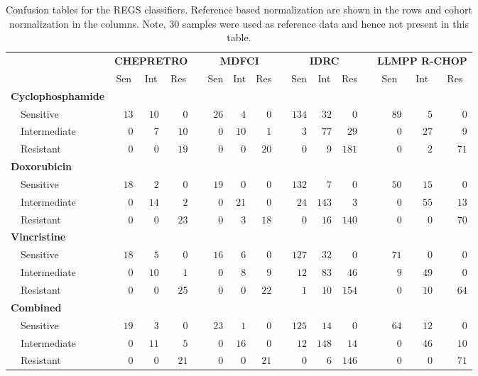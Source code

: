 \begin{table}[!tbp]
\begin{adjustwidth}{-1.5in}{0in}
{\small
\caption{Confusion tables for the REGS classifiers.
Reference based normalization are shown in the rows and cohort normalization in
the columns. Note, 30 samples were used as reference data and hence not present
in this table.\label{tab:confusiondrugreference}} 
\begin{center}
\begin{tabular}{lrrrcrrrcrrrcrrr}
\hline\hline
\multicolumn{1}{l}{\bfseries }&\multicolumn{3}{c}{\bfseries CHEPRETRO}&\multicolumn{1}{c}{\bfseries }&\multicolumn{3}{c}{\bfseries MDFCI}&\multicolumn{1}{c}{\bfseries }&\multicolumn{3}{c}{\bfseries IDRC}&\multicolumn{1}{c}{\bfseries }&\multicolumn{3}{c}{\bfseries LLMPP R-CHOP}\tabularnewline
\cline{2-4} \cline{6-8} \cline{10-12} \cline{14-16}
\multicolumn{1}{l}{}&\multicolumn{1}{c}{Sen}&\multicolumn{1}{c}{Int}&\multicolumn{1}{c}{Res}&\multicolumn{1}{c}{}&\multicolumn{1}{c}{Sen}&\multicolumn{1}{c}{Int}&\multicolumn{1}{c}{Res}&\multicolumn{1}{c}{}&\multicolumn{1}{c}{Sen}&\multicolumn{1}{c}{Int}&\multicolumn{1}{c}{Res}&\multicolumn{1}{c}{}&\multicolumn{1}{c}{Sen}&\multicolumn{1}{c}{Int}&\multicolumn{1}{c}{Res}\tabularnewline
\hline
{\bfseries Cyclophosphamide}&&&&&&&&&&&&&&&\tabularnewline
~~Sensitive&$13$&$10$&$ 0$&&$26$&$ 4$&$ 0$&&$134$&$ 32$&$  0$&&$89$&$ 5$&$ 0$\tabularnewline
~~Intermediate&$ 0$&$ 7$&$10$&&$ 0$&$10$&$ 1$&&$  3$&$ 77$&$ 29$&&$ 0$&$27$&$ 9$\tabularnewline
~~Resistant&$ 0$&$ 0$&$19$&&$ 0$&$ 0$&$20$&&$  0$&$  9$&$181$&&$ 0$&$ 2$&$71$\tabularnewline
\hline
{\bfseries Doxorubicin}&&&&&&&&&&&&&&&\tabularnewline
~~Sensitive&$18$&$ 2$&$ 0$&&$19$&$ 0$&$ 0$&&$132$&$  7$&$  0$&&$50$&$15$&$ 0$\tabularnewline
~~Intermediate&$ 0$&$14$&$ 2$&&$ 0$&$21$&$ 0$&&$ 24$&$143$&$  3$&&$ 0$&$55$&$13$\tabularnewline
~~Resistant&$ 0$&$ 0$&$23$&&$ 0$&$ 3$&$18$&&$  0$&$ 16$&$140$&&$ 0$&$ 0$&$70$\tabularnewline
\hline
{\bfseries Vincristine}&&&&&&&&&&&&&&&\tabularnewline
~~Sensitive&$18$&$ 5$&$ 0$&&$16$&$ 6$&$ 0$&&$127$&$ 32$&$  0$&&$71$&$ 0$&$ 0$\tabularnewline
~~Intermediate&$ 0$&$10$&$ 1$&&$ 0$&$ 8$&$ 9$&&$ 12$&$ 83$&$ 46$&&$ 9$&$49$&$ 0$\tabularnewline
~~Resistant&$ 0$&$ 0$&$25$&&$ 0$&$ 0$&$22$&&$  1$&$ 10$&$154$&&$ 0$&$10$&$64$\tabularnewline
\hline
{\bfseries Combined}&&&&&&&&&&&&&&&\tabularnewline
~~Sensitive&$19$&$ 3$&$ 0$&&$23$&$ 1$&$ 0$&&$125$&$ 14$&$  0$&&$64$&$12$&$ 0$\tabularnewline
~~Intermediate&$ 0$&$11$&$ 5$&&$ 0$&$16$&$ 0$&&$ 12$&$148$&$ 14$&&$ 0$&$46$&$10$\tabularnewline
~~Resistant&$ 0$&$ 0$&$21$&&$ 0$&$ 0$&$21$&&$  0$&$  6$&$146$&&$ 0$&$ 0$&$71$\tabularnewline
\hline
\end{tabular}\end{center}}
\end{adjustwidth}
\end{table}
